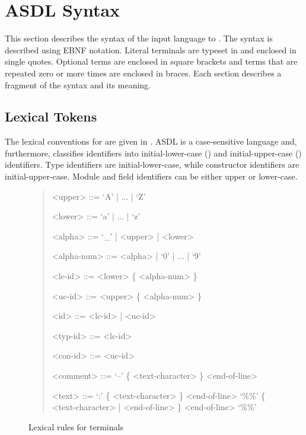 %
\chapter{ASDL Syntax}
\label{chap:syntax}

This section describes the syntax of the input language to \asdlgen{}.
The syntax is described using EBNF notation.
Literal terminals are typeset in  and enclosed in single quotes.
Optional terms are enclosed in square brackets and terms that are
repeated zero or more times are enclosed in braces.
Each section describes a fragment of the syntax and its meaning.

\section{Lexical Tokens}

The lexical conventions for \asdl{} are given in .
ASDL is a case-sensitive language and, furthermore, classifies identifiers
into initial-lower-case () and initial-upper-case () identifiers.
Type identifiers are initial-lower-case, while constructor identifiers are initial-upper-case.
Module and field identifiers can be either upper or lower-case.

\begin{figure}[t]
  \begin{quote}
    \begin{grammar}
      <upper>     ::= `A' | ... | `Z'

      <lower>     ::= `a' | ... | `z'

      <alpha>     ::= `_' | <upper> | <lower>

      <alpha-num> ::= <alpha> | `0' | ... | `9'

      <lc-id>     ::= <lower> \{ <alpha-num> \}
      
      <uc-id>     ::= <upper> \{ <alpha-num> \}

      <id>        ::= <lc-id> | <uc-id>
                  
      <typ-id>    ::= <lc-id>

      <con-id>    ::= <uc-id>

      <comment>   ::= `--' \{ <text-character> \} <end-of-line>

      <text>      ::= `:' \{ <text-character> \} <end-of-line>
               \alt{} `\%\%' \{ <text-character> | <end-of-line> \} <end-of-line> `\%\%'
    \end{grammar}
  \end{quote}
  \caption{Lexical rules for \asdl{} terminals}
  \label{fig:lexical-syntax}
\end{figure}%

